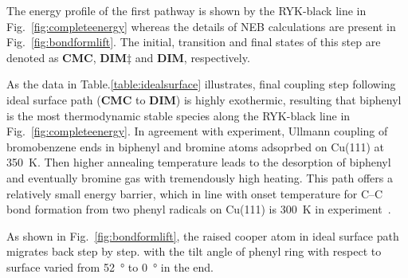 \documentclass[%
 reprint,
 amsmath,amssymb,
 aps,
prb,
floatfix,
]{revtex4-2}
\newcommand{\lock}{\color{red}}
\newcommand{\lock}{\color{red}}
\newcommand{\comm}{\color{Purple}} %
\begin{document}
{\lock
The energy profile of the first pathway is shown by the RYK-black line in Fig.~\ref{fig:completeenergy} whereas the details of NEB calculations are present in Fig.~\ref{fig:bondformlift}. The initial, transition and final states of this step are denoted as \textbf{CMC}, \textbf{DIM$\ddagger$} and \textbf{DIM}, respectively.
}
{\color{blue}
As the data in Table.\ref{table:idealsurface} illustrates, final coupling step following ideal surface path (\textbf{CMC} to \textbf{DIM}) is highly exothermic, resulting that biphenyl is the most thermodynamic stable species along the RYK-black line in Fig.~\ref{fig:completeenergy}. In agreement with experiment, Ullmann coupling of bromobenzene ends in biphenyl and bromine atoms adsoprbed on Cu(111) at \SI{350}{\kelvin}\cite{ullmann_67}. Then higher annealing temperature leads to the desorption of biphenyl and eventually bromine gas with tremendously high heating.
This path offers a relatively small energy barrier, which in line with onset temperature for C--C bond formation from two phenyl radicals on Cu(111) is \SI{300}{\kelvin} in experiment~\cite{sur_sci01}.

As shown in Fig.~\ref{fig:bondformlift}, the raised cooper atom in ideal surface path migrates back step by step. with the tilt angle of phenyl ring with respect to surface varied from \SI{52}{\degree} to \SI{0}{\degree} in the end.
 

 
}
\end{document}

